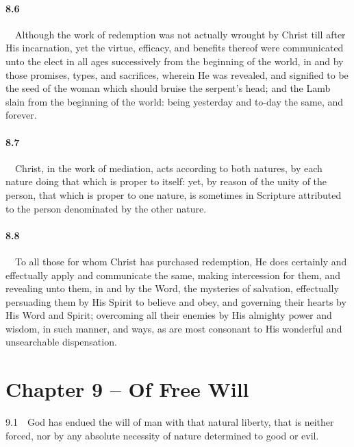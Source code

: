 \paragraph{8.6}\ \ Although the work of redemption was not actually wrought by Christ till after His incarnation, yet the virtue, efficacy, and benefits thereof were communicated unto the elect in all ages successively from the beginning of the world, in and by those promises, types, and sacrifices, wherein He was revealed, and signified to be the seed of the woman which should bruise the serpent{}'s head; and the Lamb slain from the beginning of the world: being yesterday and to-day the same, and forever.   
\bigskip
\paragraph{8.7}\ \ Christ, in the work of mediation, acts according to both natures, by each nature doing that which is proper to itself: yet, by reason of the unity of the person, that which is proper to one nature, is sometimes in Scripture attributed to the person denominated by the other nature.   
\bigskip

\bigskip
\paragraph{8.8}\ \ To all those for whom Christ has purchased redemption, He does certainly and effectually apply and communicate the same, making intercession for them, and revealing unto them, in and by the Word, the mysteries of salvation, effectually persuading them by His Spirit to believe and obey, and governing their hearts by His Word and Spirit; overcoming all their enemies by His almighty power and wisdom, in such manner, and ways, as are most consonant to His wonderful and unsearchable dispensation.  

\section{Chapter 9 -- Of Free Will} 9.1\ \ God has endued the will of man with that natural liberty, that is neither forced, nor by any absolute necessity of nature determined to good or evil.   
\bigskip
